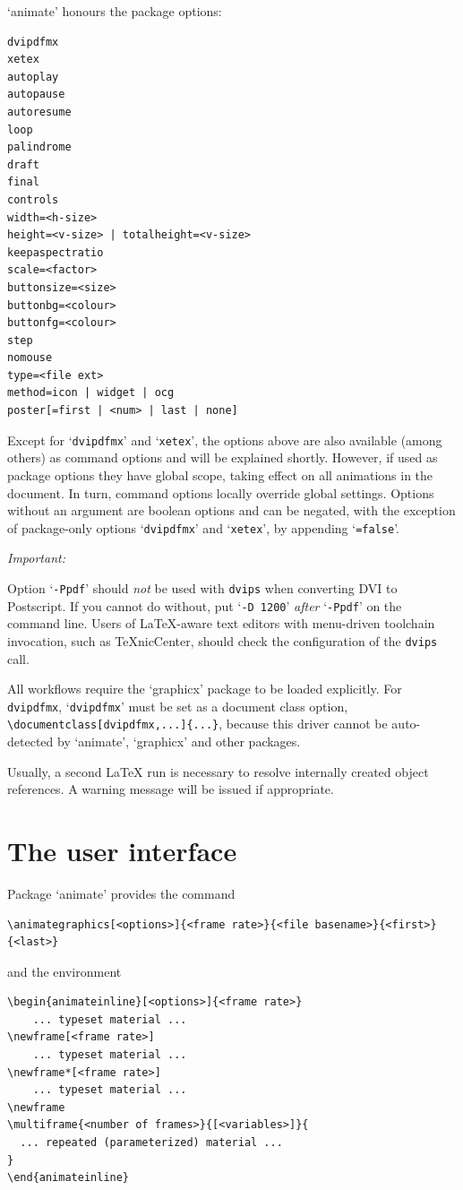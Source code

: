 \documentclass[a4paper]{article}
\begin{document}
`animate' honours the package options:
\begin{verbatim}
dvipdfmx
xetex
autoplay
autopause
autoresume
loop
palindrome
draft
final
controls
width=<h-size>
height=<v-size> | totalheight=<v-size>
keepaspectratio
scale=<factor>
buttonsize=<size>
buttonbg=<colour>
buttonfg=<colour>
step
nomouse
type=<file ext>
method=icon | widget | ocg
poster[=first | <num> | last | none]
\end{verbatim}
Except for `\verb+dvipdfmx+' and `\verb+xetex+', the options above are also available (among others) as command options and will be explained shortly. However, if used as package options they have global scope, taking effect on all animations in the document. In turn, command options locally override global settings. Options without an argument are boolean options and can be negated, with the exception of package-only options `\verb+dvipdfmx+' and `\verb+xetex+', by appending `\verb+=false+'.

\begin{animateinline}{1}\strut\emph{Important:}\newframe[3]\end{animateinline} Option `\verb+-Ppdf+' should \emph{not} be used with \verb+dvips+ when converting DVI to Postscript. If you cannot do without, put `\verb+-D 1200+' \emph{after} `\verb+-Ppdf+' on the command line. Users of \LaTeX-aware text editors with menu-driven toolchain invocation, such as \TeX{}nicCenter, should check the configuration of the \verb+dvips+ call.

All workflows require the `graphicx' package to be loaded explicitly. For \verb+dvipdfmx+, `\verb+dvipdfmx+' must be set as a document class option, \verb+\documentclass[dvipdfmx,...]{...}+, because this driver cannot be auto-detected by `animate', `graphicx' and other packages.

Usually, a second \LaTeX{} run is necessary to resolve internally created object references. A warning message will be issued if appropriate.

\clearpage
\section{The user interface}
Package `animate' provides the command
\begin{verbatim}
\animategraphics[<options>]{<frame rate>}{<file basename>}{<first>}{<last>}
\end{verbatim}
and the environment
\begin{verbatim}
\begin{animateinline}[<options>]{<frame rate>}
    ... typeset material ...
\newframe[<frame rate>]
    ... typeset material ...
\newframe*[<frame rate>]
    ... typeset material ...
\newframe
\multiframe{<number of frames>}{[<variables>]}{
  ... repeated (parameterized) material ...
}
\end{animateinline}
\end{verbatim}
\end{document}
